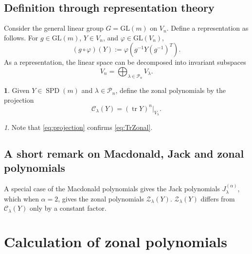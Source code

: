 \documentclass{mathincs}
\numberwithin{equation}{section}
\numberwithin{figure}{section}
\theoremstyle{plain}
\theoremstyle{definition}
\newtheorem{defn}[thm]{\protect\definitionname}
\theoremstyle{remark}
\newtheorem{rem}[thm]{\protect\remarkname}
\theoremstyle{plain}
\theoremstyle{definition}
\theoremstyle{plain}
\theoremstyle{plain}
\DeclareMathOperator{\Tr}{tr}
\newcommand{\SPD}{\operatorname{SPD}}
\providecommand{\definitionname}{Definition}
\providecommand{\remarkname}{Remark}
\begin{document}
\subsection{Definition through representation theory}

Consider the general linear group $G=\mathrm{GL}(m)$ on
$V_{n}$. Define a representation as follows. For $g\in\mathrm{GL}(m)$, $Y\in V_n$, and $\varphi\in\mathrm{GL}(V_n)$, 
\[
\left(g\circ\varphi\right)(Y):=\varphi\left(g^{-1}Y\left(g^{-1}\right)^{T}\right).
\]
As a representation, the linear space can be decomposed into invariant
subspaces \cite[p.~611]{Representation}
\[
V_{n}=\bigoplus_{\lambda\in\mathcal{P}_{n}}V_{\lambda}.
\]

\begin{defn}
Given $Y\in \SPD(m)$ and $\lambda\in\mathcal{P}_{n}$, define the zonal polynomials by
the projection
\begin{equation}
\mathcal{C}_{\lambda}(Y)=(\Tr Y)^{n}\Big|_{V_{\lambda}}.\label{eq:projection}
\end{equation}
\end{defn}
\begin{rem}
Note that \eqref{eq:projection} confirms \eqref{eq:TrZonal}. 
\end{rem}

\subsection{A short remark on Macdonald, Jack and zonal polynomials}

A special case of the Macdonald polynomials gives the Jack polynomials $J_{\lambda}^{(\alpha)}$,
which when $\alpha=2$, gives the zonal polynomials $\mathcal{Z}_\lambda(Y)$. $\mathcal{Z}_\lambda(Y)$ differs from $\mathcal{C}_\lambda(Y)$ only by a constant factor. 


\section{Calculation of zonal polynomials}\label{sec:calc}
\end{document}

